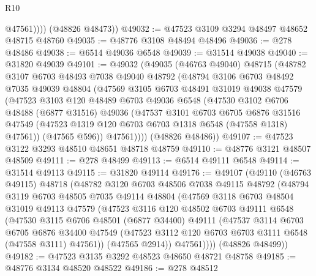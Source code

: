 \begin{lexlean}{R10}
\begin{coremodule}
              @47561))))
      (@48826 @48473))
@49032 := @47523 @3109 @3294 @48497 @48652 @48715 @48760
@49035 := @48776 @3108 @48494 @48496
@49036 := @278 @48486
@49038 := @6514 @49036 @6548
@49039 := @31514 @49038
@49040 := @31820 @49039
@49101 := @49032
    (@49035
      (@46763 @49040)
      @48715
      (@48782
        @3107
        @6703
        @48493
        @7038
        @49040
        @48792
        (@48794
          @3106
          @6703
          @48492
          @7035
          @49039
          @48804
          (@47569
            @3105
            @6703
            @48491
            @31019
            @49038
            @47579
            (@47523
              @3103
              @120
              @48489
              @6703
              @49036
              @6548
              (@47530
                @3102
                @6706
                @48488
                (@6877 @31516)
                @49036
                (@47537
                  @3101
                  @6703
                  @6705
                  @6876
                  @31516
                  @47549
                  (@47523 @1319 @120 @6703 @6703 @1318 @6548 (@47558 @1318) @47561))
                (@47565 @596))
              @47561))))
      (@48826 @48486))
@49107 := @47523 @3122 @3293 @48510 @48651 @48718 @48759
@49110 := @48776 @3121 @48507 @48509
@49111 := @278 @48499
@49113 := @6514 @49111 @6548
@49114 := @31514 @49113
@49115 := @31820 @49114
@49176 := @49107
    (@49110
      (@46763 @49115)
      @48718
      (@48782
        @3120
        @6703
        @48506
        @7038
        @49115
        @48792
        (@48794
          @3119
          @6703
          @48505
          @7035
          @49114
          @48804
          (@47569
            @3118
            @6703
            @48504
            @31019
            @49113
            @47579
            (@47523
              @3116
              @120
              @48502
              @6703
              @49111
              @6548
              (@47530
                @3115
                @6706
                @48501
                (@6877 @34400)
                @49111
                (@47537
                  @3114
                  @6703
                  @6705
                  @6876
                  @34400
                  @47549
                  (@47523 @3112 @120 @6703 @6703 @3111 @6548 (@47558 @3111) @47561))
                (@47565 @2914))
              @47561))))
      (@48826 @48499))
@49182 := @47523 @3135 @3292 @48523 @48650 @48721 @48758
@49185 := @48776 @3134 @48520 @48522
@49186 := @278 @48512

\end{coremodule}
\end{lexlean}
